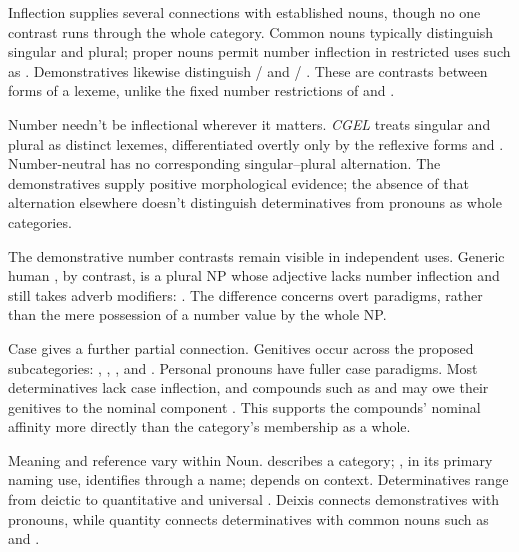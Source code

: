 \documentclass[12pt]{article}
\begin{document}
Inflection supplies several connections with established nouns, though no one contrast runs through the whole category. Common nouns typically distinguish singular and plural; proper nouns permit number inflection in restricted uses such as . Demonstratives likewise distinguish / and / \citep[373, 521]{huddleston2002}. These are contrasts between forms of a lexeme, unlike the fixed number restrictions of  and .

Number needn't be inflectional wherever it matters. \textit{CGEL} treats singular and plural  as distinct lexemes, differentiated overtly only by the reflexive forms  and  \citep[486]{huddleston2002}. Number-neutral  has no corresponding singular--plural alternation. The demonstratives supply positive morphological evidence; the absence of that alternation elsewhere doesn't distinguish determinatives from pronouns as whole categories.

The demonstrative number contrasts remain visible in independent uses. Generic human , by contrast, is a plural NP whose adjective lacks number inflection and still takes adverb modifiers:  \citep[418]{huddleston2002}. The difference concerns overt paradigms, rather than the mere possession of a number value by the whole NP.

Case gives a further partial connection. Genitives occur across the proposed subcategories: , , , and . Personal pronouns have fuller case paradigms. Most determinatives lack case inflection, and compounds such as  and  may owe their genitives to the nominal component \citep[423--424, 479--480]{huddleston2002}. This supports the compounds' nominal affinity more directly than the category's membership as a whole.

Meaning and reference vary within Noun.  describes a category; , in its primary naming use, identifies through a name;  depends on context. Determinatives range from deictic  to quantitative  and universal  \citep[358--360, 370--405, 425--428, 515--521]{huddleston2002}. Deixis connects demonstratives with pronouns, while quantity connects determinatives with common nouns such as  and .
\end{document}
